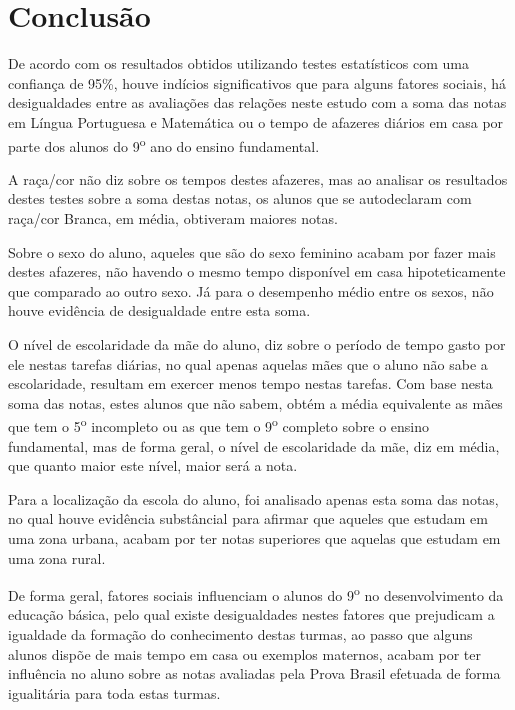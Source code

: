
\chapter{Conclusão}

De acordo com os resultados obtidos utilizando testes estatísticos com uma confiança de 95\%, 
houve indícios significativos que para alguns fatores sociais,
há desigualdades entre as avaliações das relações neste estudo com a soma das notas em Língua
Portuguesa e Matemática ou o tempo de afazeres diários em casa por parte dos alunos do 9\textsuperscript{o} ano
do ensino fundamental.

A raça/cor não diz sobre os tempos destes afazeres, mas ao analisar os resultados destes testes sobre a soma destas notas,
os alunos que se autodeclaram com raça/cor Branca, em média, obtiveram maiores notas.

Sobre o sexo do aluno, aqueles que são do sexo feminino acabam por fazer mais destes afazeres, não havendo
o mesmo tempo disponível em casa hipoteticamente que comparado ao outro sexo. Já para o desempenho médio entre os sexos,
não houve evidência de desigualdade entre esta soma. 

O nível de escolaridade da mãe do aluno, diz sobre o período de tempo gasto por ele nestas tarefas diárias,
no qual apenas aquelas mães que o aluno não sabe a escolaridade, resultam em exercer menos tempo nestas tarefas.
Com base nesta soma das notas, estes alunos que não sabem, obtém a média equivalente as mães que tem o 5\textsuperscript{o}
incompleto ou as que tem o 9\textsuperscript{o} completo sobre o ensino fundamental, mas de forma geral,
o nível de escolaridade da mãe, diz em média, que quanto maior este nível, maior será a nota.

Para a localização da escola do aluno, foi analisado apenas esta soma das notas, no qual houve evidência
substâncial para afirmar que aqueles que estudam em uma zona urbana, acabam por ter notas superiores que aquelas
que estudam em uma zona rural. 

De forma geral, fatores sociais influenciam o alunos do 9\textsuperscript{o} no desenvolvimento da educação básica,
pelo qual existe desigualdades nestes fatores que prejudicam a igualdade da formação do conhecimento destas turmas,
ao passo que alguns alunos dispõe de mais tempo em casa ou exemplos maternos, acabam por ter influência no aluno sobre as 
notas avaliadas pela Prova Brasil efetuada de forma igualitária para toda estas turmas.

